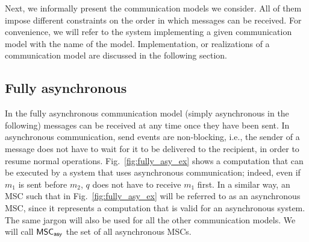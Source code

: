 
Next, we informally present the communication models we consider. All of them impose different constraints on the order in which messages can be received.
For convenience, we will refer to the system implementing a given communication model with the name of the model. Implementation, or realizations of a communication model are discussed in the following section.

%
\subsection{Fully asynchronous}
In the fully asynchronous communication model (simply asynchronous in the following) messages can be received at any time once they have been sent. In asynchronous communication, send events are non-blocking, i.e., the sender of a message does not have to wait for it to be delivered to the recipient, in order to resume normal operations. Fig.~\ref{fig:fully_asy_ex} shows a computation that can be executed by a system that uses asynchronous communication; indeed, even if $m_1$ is sent before $m_2$, $q$ does not have to receive $m_1$ first.  In a similar way, an MSC such that in Fig.~\ref{fig:fully_asy_ex} will be referred to as an asynchronous MSC, since it represents a computation that is valid for an asynchronous system. The same jargon will also be used for all the other communication models. We will call $\mathsf{MSC}_{\mathsf{asy}}$ the set of all asynchronous MSCs.

